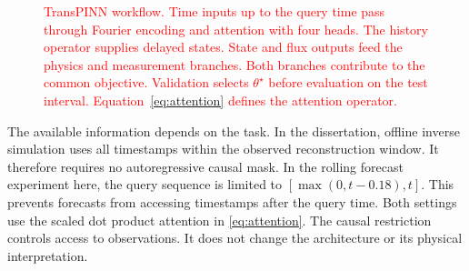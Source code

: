 \documentclass[letterpaper,journal]{IEEEtran}
\begin{document}
\begin{figure}[t]
{%
		}
		\caption{\textcolor{red}{
TransPINN workflow. Time inputs up to the query time pass through Fourier encoding and attention with four heads. The history operator supplies delayed states. State and flux outputs feed the physics and measurement branches. Both branches contribute to the common objective. Validation selects $\theta^\star$ before evaluation on the test interval. Equation~\eqref{eq:attention} defines the attention operator.
}}
		\label{fig:transpinn_workflow}
	\end{figure}

	The available information depends on the task. In the dissertation, offline inverse simulation uses all timestamps within the observed reconstruction window. It therefore requires no autoregressive causal mask. In the rolling forecast experiment here, the query sequence is limited to $[\max(0,t-0.18),t]$. This prevents forecasts from accessing timestamps after the query time. Both settings use the scaled dot product attention in \eqref{eq:attention}. The causal restriction controls access to observations. It does not change the architecture or its physical interpretation.
\end{document}
